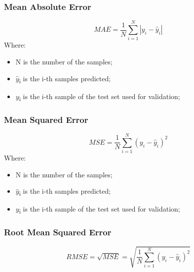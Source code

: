 \subsubsection{Mean Absolute Error}
\begin{equation}
MAE = \frac{1}{N}\sum_{i=1}^{N}|y_i-\hat{y}_i|
\end{equation}
Where:
\begin{itemize}
    \item N is the number of the samples;
    \item $\hat{y}$\textsubscript{i} is the i-th samples predicted;
    \item $y$\textsubscript{i} is the i-th sample of the test set used for validation;
\end{itemize}
\pagebreak
\subsubsection{Mean Squared Error}
\begin{equation}
MSE = \frac{1}{N}\sum_{i=1}^{N}(y_i-\hat{y}_i)^2
\end{equation}
Where:
\begin{itemize}
    \item N is the number of the samples;
    \item $\hat{y}$\textsubscript{i} is the i-th samples predicted;
    \item $y$\textsubscript{i} is the i-th sample of the test set used for validation;
\end{itemize}
\subsubsection{Root Mean Squared Error}
\begin{equation}
RMSE = \sqrt{MSE}= \sqrt{\frac{1}{N}\sum_{i=1}^{N}(y_i-\hat{y}_i)^2}
\end{equation}
